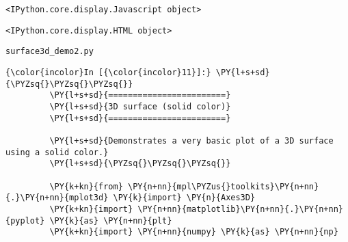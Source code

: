     
    \begin{verbatim}
<IPython.core.display.Javascript object>
    \end{verbatim}

    
    
    \begin{verbatim}
<IPython.core.display.HTML object>
    \end{verbatim}

    
    \texttt{surface3d\_demo2.py}

    \begin{Verbatim}[commandchars=\\\{\},frame=single,framerule=0.3mm,rulecolor=\color{cellframecolor}]
{\color{incolor}In [{\color{incolor}11}]:} \PY{l+s+sd}{\PYZsq{}\PYZsq{}\PYZsq{}}
         \PY{l+s+sd}{========================}
         \PY{l+s+sd}{3D surface (solid color)}
         \PY{l+s+sd}{========================}
         
         \PY{l+s+sd}{Demonstrates a very basic plot of a 3D surface using a solid color.}
         \PY{l+s+sd}{\PYZsq{}\PYZsq{}\PYZsq{}}
         
         \PY{k+kn}{from} \PY{n+nn}{mpl\PYZus{}toolkits}\PY{n+nn}{.}\PY{n+nn}{mplot3d} \PY{k}{import} \PY{n}{Axes3D}
         \PY{k+kn}{import} \PY{n+nn}{matplotlib}\PY{n+nn}{.}\PY{n+nn}{pyplot} \PY{k}{as} \PY{n+nn}{plt}
         \PY{k+kn}{import} \PY{n+nn}{numpy} \PY{k}{as} \PY{n+nn}{np}
\end{Verbatim}


